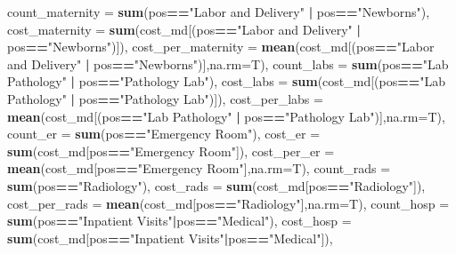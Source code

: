 \documentclass[]{article}
\newenvironment{Shaded}{\begin{snugshade}}{\end{snugshade}}
\newcommand{\KeywordTok}[1]{\textcolor[rgb]{0.13,0.29,0.53}{\textbf{#1}}}
\newcommand{\DataTypeTok}[1]{\textcolor[rgb]{0.13,0.29,0.53}{#1}}
\newcommand{\StringTok}[1]{\textcolor[rgb]{0.31,0.60,0.02}{#1}}
\newcommand{\OperatorTok}[1]{\textcolor[rgb]{0.81,0.36,0.00}{\textbf{#1}}}
\newcommand{\NormalTok}[1]{#1}
\begin{document}
\begin{Shaded}
\begin{Highlighting}[]
{{{{{{            \DataTypeTok{count_maternity =} \KeywordTok{sum}\NormalTok{(pos}\OperatorTok{==}\StringTok{"Labor and Delivery"} \OperatorTok{|}\StringTok{ }\NormalTok{pos}\OperatorTok{==}\StringTok{"Newborns"}\NormalTok{),}
            \DataTypeTok{cost_maternity =} \KeywordTok{sum}\NormalTok{(cost_md[(pos}\OperatorTok{==}\StringTok{"Labor and Delivery"} \OperatorTok{|}\StringTok{ }\NormalTok{pos}\OperatorTok{==}\StringTok{"Newborns"}\NormalTok{)]),}
            \DataTypeTok{cost_per_maternity =} \KeywordTok{mean}\NormalTok{(cost_md[(pos}\OperatorTok{==}\StringTok{"Labor and Delivery"} \OperatorTok{|}\StringTok{ }\NormalTok{pos}\OperatorTok{==}\StringTok{"Newborns"}\NormalTok{)],}\DataTypeTok{na.rm=}\NormalTok{T),}
            \DataTypeTok{count_labs =} \KeywordTok{sum}\NormalTok{(pos}\OperatorTok{==}\StringTok{"Lab Pathology"} \OperatorTok{|}\StringTok{ }\NormalTok{pos}\OperatorTok{==}\StringTok{"Pathology Lab"}\NormalTok{),}
            \DataTypeTok{cost_labs =} \KeywordTok{sum}\NormalTok{(cost_md[(pos}\OperatorTok{==}\StringTok{"Lab Pathology"} \OperatorTok{|}\StringTok{ }\NormalTok{pos}\OperatorTok{==}\StringTok{"Pathology Lab"}\NormalTok{)]),}
            \DataTypeTok{cost_per_labs =} \KeywordTok{mean}\NormalTok{(cost_md[(pos}\OperatorTok{==}\StringTok{"Lab Pathology"} \OperatorTok{|}\StringTok{ }\NormalTok{pos}\OperatorTok{==}\StringTok{"Pathology Lab"}\NormalTok{)],}\DataTypeTok{na.rm=}\NormalTok{T),}
            \DataTypeTok{count_er =} \KeywordTok{sum}\NormalTok{(pos}\OperatorTok{==}\StringTok{"Emergency Room"}\NormalTok{),}
            \DataTypeTok{cost_er =} \KeywordTok{sum}\NormalTok{(cost_md[pos}\OperatorTok{==}\StringTok{"Emergency Room"}\NormalTok{]),}
            \DataTypeTok{cost_per_er =} \KeywordTok{mean}\NormalTok{(cost_md[pos}\OperatorTok{==}\StringTok{"Emergency Room"}\NormalTok{],}\DataTypeTok{na.rm=}\NormalTok{T),}
            \DataTypeTok{count_rads =} \KeywordTok{sum}\NormalTok{(pos}\OperatorTok{==}\StringTok{"Radiology"}\NormalTok{),}
            \DataTypeTok{cost_rads =} \KeywordTok{sum}\NormalTok{(cost_md[pos}\OperatorTok{==}\StringTok{"Radiology"}\NormalTok{]),}
            \DataTypeTok{cost_per_rads =} \KeywordTok{mean}\NormalTok{(cost_md[pos}\OperatorTok{==}\StringTok{"Radiology"}\NormalTok{],}\DataTypeTok{na.rm=}\NormalTok{T),}
            \DataTypeTok{count_hosp =} \KeywordTok{sum}\NormalTok{(pos}\OperatorTok{==}\StringTok{"Inpatient Visits"}\OperatorTok{|}\NormalTok{pos}\OperatorTok{==}\StringTok{"Medical"}\NormalTok{),}
            \DataTypeTok{cost_hosp =} \KeywordTok{sum}\NormalTok{(cost_md[pos}\OperatorTok{==}\StringTok{"Inpatient Visits"}\OperatorTok{|}\NormalTok{pos}\OperatorTok{==}\StringTok{"Medical"}\NormalTok{]),}
}}}}}}
\end{Highlighting}
\end{Shaded}
\end{document}
